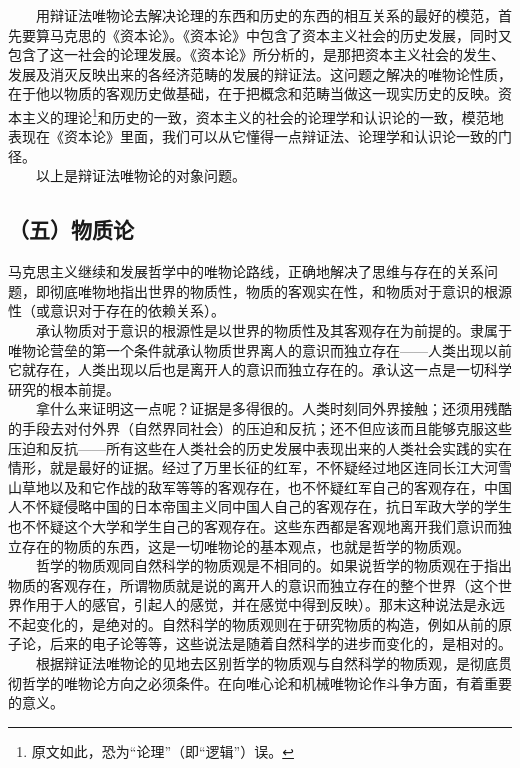 \documentclass[cn,11pt,chinese]{elegantbook}
\def\myformat#1{\hfil\hfil #1}
\begin{document}
　　用辩证法唯物论去解决论理的东西和历史的东西的相互关系的最好的模范，首先要算马克思的《资本论》。《资本论》中包含了资本主义社会的历史发展，同时又包含了这一社会的论理发展。《资本论》所分析的，是那把资本主义社会的发生、发展及消灭反映出来的各经济范畴的发展的辩证法。这问题之解决的唯物论性质，在于他以物质的客观历史做基础，在于把概念和范畴当做这一现实历史的反映。资本主义的理论\footnote[12]{ 原文如此，恐为“论理”（即“逻辑”）误。}和历史的一致，资本主义的社会的论理学和认识论的一致，模范地表现在《资本论》里面，我们可以从它懂得一点辩证法、论理学和认识论一致的门径。\\
　　以上是辩证法唯物论的对象问题。\\
\subsection*{\myformat{（五）物质论}}
马克思主义继续和发展哲学中的唯物论路线，正确地解决了思维与存在的关系问题，即彻底唯物地指出世界的物质性，物质的客观实在性，和物质对于意识的根源性（或意识对于存在的依赖关系）。\\
　　承认物质对于意识的根源性是以世界的物质性及其客观存在为前提的。隶属于唯物论营垒的第一个条件就承认物质世界离人的意识而独立存在——人类出现以前它就存在，人类出现以后也是离开人的意识而独立存在的。承认这一点是一切科学研究的根本前提。\\
　　拿什么来证明这一点呢？证据是多得很的。人类时刻同外界接触；还须用残酷的手段去对付外界（自然界同社会）的压迫和反抗；还不但应该而且能够克服这些压迫和反抗——所有这些在人类社会的历史发展中表现出来的人类社会实践的实在情形，就是最好的证据。经过了万里长征的红军，不怀疑经过地区连同长江大河雪山草地以及和它作战的敌军等等的客观存在，也不怀疑红军自己的客观存在，中国人不怀疑侵略中国的日本帝国主义同中国人自己的客观存在，抗日军政大学的学生也不怀疑这个大学和学生自己的客观存在。这些东西都是客观地离开我们意识而独立存在的物质的东西，这是一切唯物论的基本观点，也就是哲学的物质观。\\
　　哲学的物质观同自然科学的物质观是不相同的。如果说哲学的物质观在于指出物质的客观存在，所谓物质就是说的离开人的意识而独立存在的整个世界（这个世界作用于人的感官，引起人的感觉，并在感觉中得到反映）。那末这种说法是永远不起变化的，是绝对的。自然科学的物质观则在于研究物质的构造，例如从前的原子论，后来的电子论等等，这些说法是随着自然科学的进步而变化的，是相对的。\\
　　根据辩证法唯物论的见地去区别哲学的物质观与自然科学的物质观，是彻底贯彻哲学的唯物论方向之必须条件。在向唯心论和机械唯物论作斗争方面，有着重要的意义。\\
\end{document}
